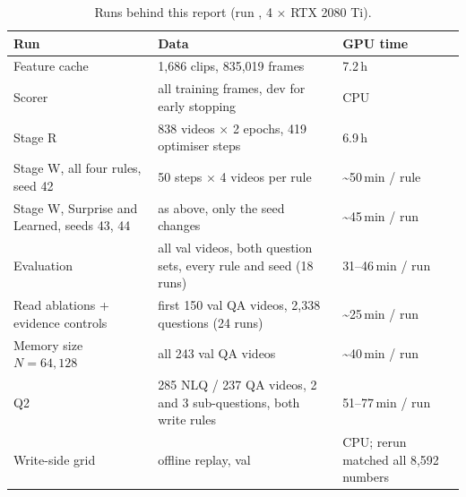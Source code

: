 \documentclass[11pt,a4paper]{article}
\newcommand{\file}[1]{\texttt{\detokenize{#1}}}
\begin{document}
\begin{table}[H]\centering\small
\caption{Runs behind this report (run \file{full_v3}, 4 $\times$ RTX 2080 Ti).}\label{tab:runs}
\begin{tabular}{l l l}
\toprule
Run & Data & GPU time \\
\midrule
Feature cache & 1,686 clips, 835,019 frames & 7.2\,h \\
Scorer & all training frames, dev for early stopping & CPU \\
Stage R & 838 videos $\times$ 2 epochs, 419 optimiser steps & 6.9\,h \\
Stage W, all four rules, seed 42 & 50 steps $\times$ 4 videos per rule & \textasciitilde50\,min / rule \\
Stage W, Surprise and Learned, seeds 43, 44 & as above, only the seed changes & \textasciitilde45\,min / run \\
Evaluation & all val videos, both question sets, every rule and seed (18 runs) & 31--46\,min / run \\
Read ablations + evidence controls & first 150 val QA videos, 2,338 questions (24 runs) & \textasciitilde25\,min / run \\
Memory size $N=64, 128$ & all 243 val QA videos & \textasciitilde40\,min / run \\
Q2 & 285 NLQ / 237 QA videos, 2 and 3 sub-questions, both write rules & 51--77\,min / run \\
Write-side grid & offline replay, val & CPU; rerun matched all 8,592 numbers \\
\bottomrule
\end{tabular}
\end{table}
\end{document}
